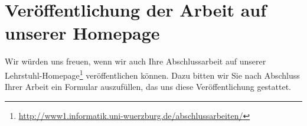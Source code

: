 \documentclass[bachelor,german]{info1thesis}
\begin{document}
\section{Veröffentlichung der Arbeit auf unserer Homepage}
Wir würden uns freuen, wenn wir auch Ihre Abschlussarbeit auf unserer
Lehrstuhl-Homepage\footnote{\url{http://www1.informatik.uni-wuerzburg.de/abschlussarbeiten/}}
veröffentlichen können.
Dazu bitten wir Sie nach Abschluss Ihrer Arbeit ein Formular auszufüllen, das
uns diese Veröffentlichung gestattet.

\end{document}
